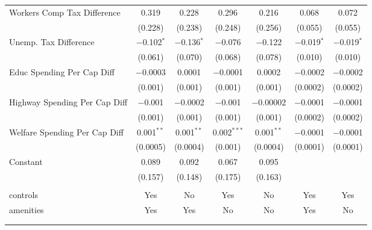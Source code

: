\begin{table}[!htbp]
\begin{tabular}{@{\extracolsep{5pt}}lcccccc}
  Workers Comp Tax Difference & 0.319 & 0.228 & 0.296 & 0.216 & 0.068 & 0.072 \\ 
  & (0.228) & (0.238) & (0.248) & (0.256) & (0.055) & (0.055) \\ 
  Unemp. Tax Difference & $-$0.102$^{*}$ & $-$0.136$^{*}$ & $-$0.076 & $-$0.122 & $-$0.019$^{*}$ & $-$0.019$^{*}$ \\ 
  & (0.061) & (0.070) & (0.068) & (0.078) & (0.010) & (0.010) \\ 
  Educ Spending Per Cap Diff & $-$0.0003 & 0.0001 & $-$0.0001 & 0.0002 & $-$0.0002 & $-$0.0002 \\ 
  & (0.001) & (0.001) & (0.001) & (0.001) & (0.0002) & (0.0002) \\ 
  Highway Spending Per Cap Diff & $-$0.001 & $-$0.0002 & $-$0.001 & $-$0.00002 & $-$0.0001 & $-$0.0001 \\ 
  & (0.001) & (0.001) & (0.001) & (0.001) & (0.0002) & (0.0002) \\ 
  Welfare Spending Per Cap Diff & 0.001$^{**}$ & 0.001$^{**}$ & 0.002$^{***}$ & 0.001$^{**}$ & $-$0.0001 & $-$0.0001 \\ 
  & (0.0005) & (0.0004) & (0.001) & (0.0004) & (0.0001) & (0.0001) \\ 
  Constant & 0.089 & 0.092 & 0.067 & 0.095 &  &  \\ 
  & (0.157) & (0.148) & (0.175) & (0.163) &  &  \\ 
 \hline \\[-1.8ex] 
controls & Yes & No & Yes & No & Yes & Yes \\ 
amenities & Yes & Yes & No & No & Yes & No \\ 
\hline \\[-1.8ex] 
\hline 
\hline \\[-1.8ex] 
\end{tabular} 
\end{table} 
